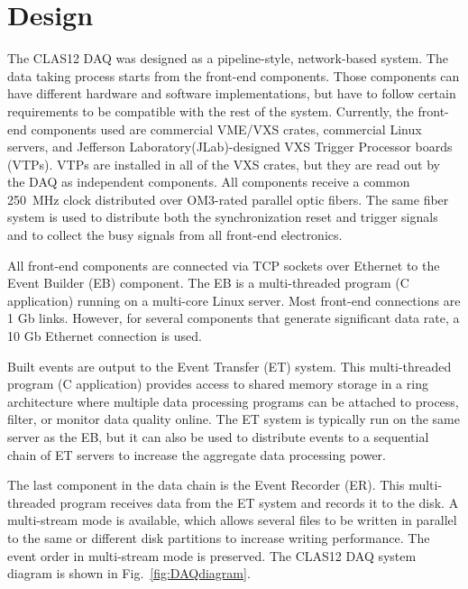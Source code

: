 \section{Design}

The CLAS12 DAQ was designed as a pipeline-style, network-based system. The data taking process starts from the front-end components. Those components can have different hardware and software implementations, but have to follow certain requirements to be compatible with the rest of the system. Currently, the front-end components used are commercial VME/VXS crates, commercial Linux servers, and Jefferson Laboratory(JLab)-designed VXS Trigger Processor boards (VTPs). VTPs are installed in all of the VXS crates, but they are read out by the DAQ as independent components. All components receive a common 250~MHz clock distributed over OM3-rated parallel optic fibers. The same fiber system is used to distribute both the synchronization reset and trigger signals and to collect the busy signals from all front-end electronics.

All front-end components are connected via TCP sockets over Ethernet to the Event Builder (EB) component. The EB is a multi-threaded program (C application) running on a multi-core Linux server. Most front-end connections are 1 Gb links. However, for several components that generate significant data rate, a 10 Gb Ethernet connection is used.

Built events are output to the Event Transfer (ET) system. This multi-threaded program (C application) provides access to shared memory storage in a ring architecture where multiple data processing programs can be attached to process, filter, or monitor data quality online. The ET system is typically run on the same server as the EB, but it can also be used to distribute events to a sequential chain of ET servers to increase the aggregate data processing power.

The last component in the data chain is the Event Recorder (ER). This multi-threaded program receives data from the ET system and records it to the disk. A multi-stream mode is available, which allows several files to be written in parallel to the same or different disk partitions to increase writing performance. The event order in multi-stream mode is preserved. The CLAS12 DAQ system diagram is shown in Fig.~\ref{fig:DAQdiagram}.

